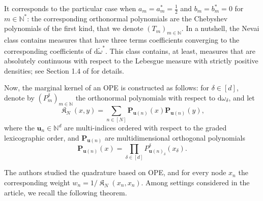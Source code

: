 \documentclass[twoside,11pt]{book}
\numberwithin{theorem}{chapter}
\numberwithin{definition}{chapter}
\numberwithin{proposition}{chapter}
\numberwithin{corollary}{chapter}
\numberwithin{example}{chapter}
\numberwithin{lemma}{chapter}
\DeclareMathOperator*{\KDPP}{\mathfrak{K}}
\begin{document}
It corresponds to the particular case when $a_{m} = a^{*}_{m} = \frac{1}{2}$ and $b_m =  b^{*}_{m} =0$ for $m \in \mathbb{N}^{*}$: the corresponding orthonormal polynomials are the Chebyshev polynomials of the first kind, that we denote $(T_{m})_{m \in \mathbb{N}}$.
In a nutshell, the Nevai class contains measures that have three terms coefficients converging to the corresponding coefficients of $\mathrm{d}\tilde{\omega}^{*}$.
 This class contains, at least, measures that are absolutely continuous with respect to the Lebesgue measure with strictly positive densities; see Section 1.4 of \citep{Sim10} for details. 

Now, the  marginal kernel of an OPE is constructed as follows: for $\delta \in [d]$, denote by 
$(P^{\delta}_{m})_{m \in \mathbb{N}}$ the orthonormal polynomials with respect to $\mathrm{d}\omega_{\delta}$, and let
\begin{equation}
\KDPP_{N}(x,y) = \sum\limits_{n \in [N]} \bm{P}_{\bm{u}(n)}(x)\bm{P}_{\bm{u}(n)}(y),
\end{equation}
where the $\bm{u}_{n} \in \mathbb{N}^{d}$ are multi-indices ordered with respect to the graded lexicographic order, and $\bm{P}_{\bm{u}(n)}$ are multidimensional orthogonal polynomials
\begin{equation}
\bm{P}_{\bm{u}(n)}(x) = \prod\limits_{\delta \in [d]} P^{\delta}_{\bm{u}(n)_{\delta}}(x_{\delta}).
\end{equation}


The authors studied the quadrature based on OPE, and for every node $x_{n}$ the corresponding weight $\displaystyle w_{n} =1/\KDPP_{N}(x_{n},x_{n})$. Among settings considered in the article, we recall the following theorem.

\end{document}
